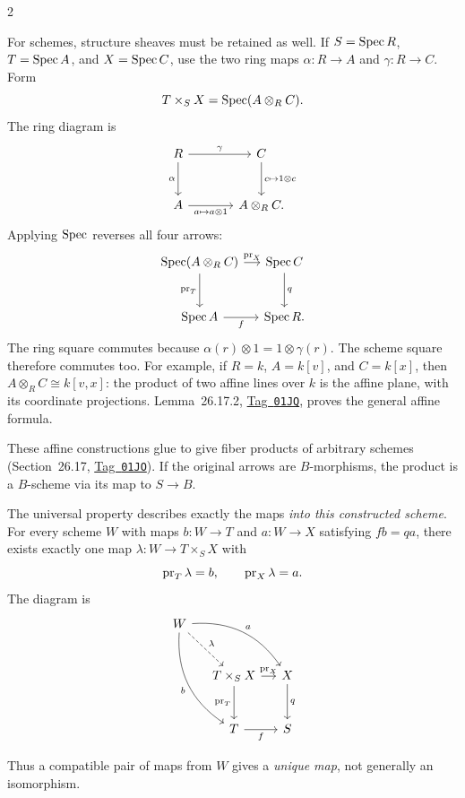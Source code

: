 \documentclass[12pt]{memoir}
\newcommand{\BGtag}[1]{\href{https://stacks.math.columbia.edu/tag/#1}{Tag~\texttt{#1}}}
\begin{document}
\begin{multicols}{2}
\begin{Ex}\label{ex:affinefiber}
For schemes, structure sheaves must be retained as well. If
$S=\operatorname{Spec} R$, $T=\operatorname{Spec} A$, and $X=\operatorname{Spec} C$, use the two ring maps
$\alpha:R\to A$ and $\gamma:R\to C$. Form
\[
 T\times_S X=\operatorname{Spec}(A\otimes_R C).
\]
The ring diagram is
\[
\begin{tikzcd}[column sep=large,row sep=large]
R \arrow[r,"\gamma"] \arrow[d,"\alpha"']
 &C \arrow[d,"c\mapsto1\otimes c"]\\
A \arrow[r,"a\mapsto a\otimes1"'] &A\otimes_R C.
\end{tikzcd}
\]
Applying $\operatorname{Spec}$ reverses all four arrows:
\[
\begin{tikzcd}[column sep=small,row sep=large]
\Spec(A\otimes_R C) \arrow[r,"\pr_X"] \arrow[d,"\pr_T"']
 &\Spec C \arrow[d,"q"]\\
\Spec A \arrow[r,"f"'] &\Spec R.
\end{tikzcd}
\]
The ring square commutes because
$\alpha(r)\otimes1=1\otimes\gamma(r)$. The scheme square therefore
commutes too. For example, if $R=k$, $A=k[v]$, and $C=k[x]$, then
$A\otimes_R C\cong k[v,x]$: the product of two affine lines over
$k$ is the affine plane, with its coordinate projections.
Lemma~26.17.2, \BGtag{01JQ}, proves the general affine formula.
\end{Ex}

These affine constructions glue to give fiber products of arbitrary
schemes (Section~26.17, \BGtag{01JO}). If the original arrows are
$B$-morphisms, the product is a $B$-scheme via its map to $S\to B$.

\begin{Def}
The universal property describes exactly the maps \emph{into this
constructed scheme}. For every scheme $W$ with maps $b:W\to T$ and
$a:W\to X$ satisfying $fb=qa$, there exists exactly one map
$\lambda:W\to T\times_S X$ with
\[
 \operatorname{pr}_T\lambda=b,\qquad \operatorname{pr}_X\lambda=a.
\]
The diagram is
\[
\begin{tikzcd}[column sep=small,row sep=large]
W \arrow[drr,bend left,"a"] \arrow[ddr,bend right,"b"']
 \arrow[dr,dashed,"\lambda"] &&\\
&T\times_S X \arrow[r,"\pr_X"] \arrow[d,"\pr_T"']
 &X \arrow[d,"q"]\\
&T \arrow[r,"f"'] &S
\end{tikzcd}
\]
\end{Def}
Thus a compatible pair of maps from $W$ gives a \emph{unique map},
not generally an isomorphism.


\end{multicols}
\end{document}

